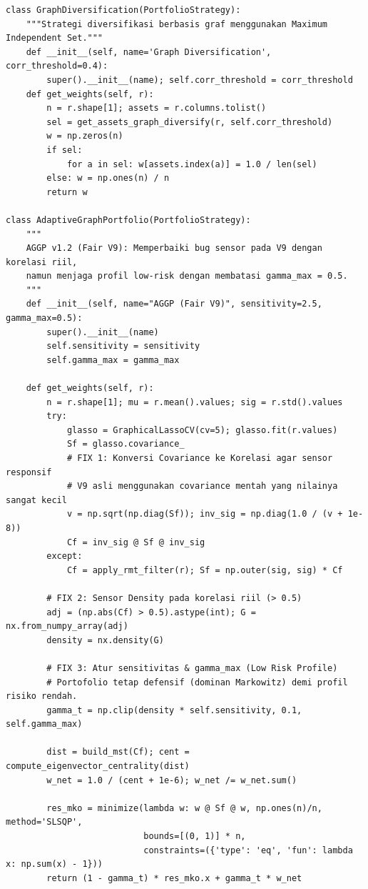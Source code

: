\documentclass[12pt,a4paper]{article}
\begin{document}
\begin{lstlisting}[caption={Kelas-kelas strategi portofolio}]
class GraphDiversification(PortfolioStrategy):
    """Strategi diversifikasi berbasis graf menggunakan Maximum Independent Set."""
    def __init__(self, name='Graph Diversification', corr_threshold=0.4):
        super().__init__(name); self.corr_threshold = corr_threshold
    def get_weights(self, r):
        n = r.shape[1]; assets = r.columns.tolist()
        sel = get_assets_graph_diversify(r, self.corr_threshold)
        w = np.zeros(n)
        if sel:
            for a in sel: w[assets.index(a)] = 1.0 / len(sel)
        else: w = np.ones(n) / n
        return w

class AdaptiveGraphPortfolio(PortfolioStrategy):
    """
    AGGP v1.2 (Fair V9): Memperbaiki bug sensor pada V9 dengan korelasi riil,
    namun menjaga profil low-risk dengan membatasi gamma_max = 0.5.
    """
    def __init__(self, name="AGGP (Fair V9)", sensitivity=2.5, gamma_max=0.5):
        super().__init__(name)
        self.sensitivity = sensitivity
        self.gamma_max = gamma_max

    def get_weights(self, r):
        n = r.shape[1]; mu = r.mean().values; sig = r.std().values
        try:
            glasso = GraphicalLassoCV(cv=5); glasso.fit(r.values)
            Sf = glasso.covariance_
            # FIX 1: Konversi Covariance ke Korelasi agar sensor responsif
            # V9 asli menggunakan covariance mentah yang nilainya sangat kecil
            v = np.sqrt(np.diag(Sf)); inv_sig = np.diag(1.0 / (v + 1e-8))
            Cf = inv_sig @ Sf @ inv_sig
        except:
            Cf = apply_rmt_filter(r); Sf = np.outer(sig, sig) * Cf

        # FIX 2: Sensor Density pada korelasi riil (> 0.5)
        adj = (np.abs(Cf) > 0.5).astype(int); G = nx.from_numpy_array(adj)
        density = nx.density(G)
        
        # FIX 3: Atur sensitivitas & gamma_max (Low Risk Profile)
        # Portofolio tetap defensif (dominan Markowitz) demi profil risiko rendah.
        gamma_t = np.clip(density * self.sensitivity, 0.1, self.gamma_max)

        dist = build_mst(Cf); cent = compute_eigenvector_centrality(dist)
        w_net = 1.0 / (cent + 1e-6); w_net /= w_net.sum()

        res_mko = minimize(lambda w: w @ Sf @ w, np.ones(n)/n, method='SLSQP', 
                           bounds=[(0, 1)] * n, 
                           constraints=({'type': 'eq', 'fun': lambda x: np.sum(x) - 1}))
        return (1 - gamma_t) * res_mko.x + gamma_t * w_net
\end{lstlisting}
\end{document}
